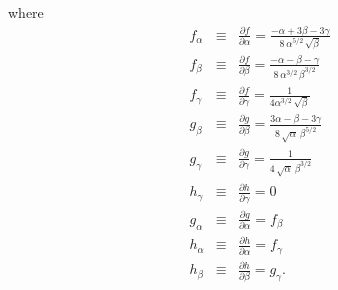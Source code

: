 \documentclass[11pt]{article}
\begin{document}
where
\begin{eqnarray}
f_\alpha &\equiv& \frac{\partial f}{\partial \alpha} =
\frac{-\alpha + 3\beta - 3\gamma} 
{8 \,\alpha^{5/2}\,\sqrt{\beta}} \\
f_\beta &\equiv& \frac{\partial f}{\partial \beta} =
\frac{-\alpha - \beta - \gamma}
{8 \,\alpha^{3/2}\,\beta^{3/2}}\\
f_\gamma &\equiv&\frac{\partial f}{\partial \gamma} =
\frac{1}{4 \alpha^{3/2}\, \sqrt{\beta}} \\
g_\beta &\equiv& \frac{\partial g}{\partial \beta} = 
\frac{3\alpha - \beta - 3\gamma}
{8 \,\sqrt{\alpha}\,\beta^{5/2}} \\
g_\gamma &\equiv& \frac{\partial g}{\partial \gamma} =
\frac{1}{4 \,\sqrt{\alpha}\, \beta^{3/2}} \\
h_\gamma &\equiv&\frac{\partial h}{\partial \gamma} = 0 \\
g_\alpha &\equiv& \frac{\partial g}{\partial \alpha} = f_\beta\\
h_\alpha &\equiv& \frac{\partial h}{\partial \alpha} = f_\gamma\\
h_\beta &\equiv& \frac{\partial h}{\partial \beta} = g_\gamma.
\end{eqnarray}
\end{document}

